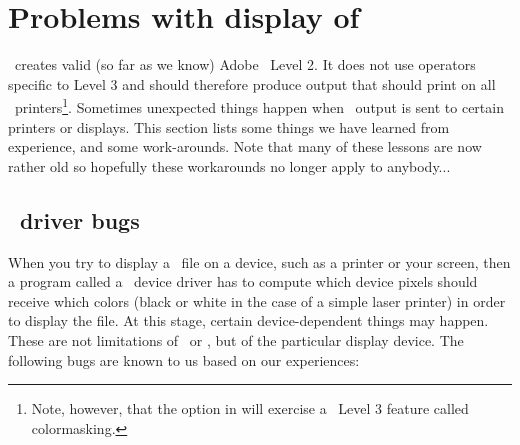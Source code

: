 %
%
\chapter{Problems with display of \gmt\ \PS}
\label{app:H}
\thispagestyle{headings}

\GMT\ creates valid (so far as we know) Adobe \PS\
Level 2.  It does not use operators specific to Level 3 and
should therefore produce output that should print on all \PS\ printers\footnote{Note, however, that the  option in 
will exercise a \PS\ Level 3 feature called colormasking.}.  Sometimes unexpected things
happen when \GMT\ output is sent to certain printers or displays.
This section lists some things we have learned from experience,
and some work-arounds.  Note that many of these lessons are now rather old so hopefully
these workarounds no longer apply to anybody...

\section{\PS\ driver bugs}

When you try to display a \PS\ file on a device,
such as a printer or your screen, then a program called a
\PS\ device driver has to compute which device
pixels should receive which colors (black or white in the case
of a simple laser printer) in order to display the file.  At
this stage, certain device-dependent things may happen.  These
are not limitations of \GMT\ or \PS, but of the
particular display device.  The following bugs are known to us
based on our experiences:

